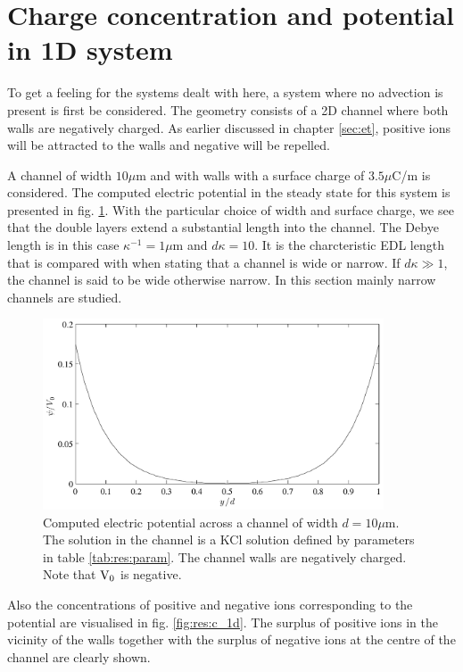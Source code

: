 \section{Charge concentration and potential in 1D system}
To get a feeling for the systems dealt with here, a system where no
advection is present is first be considered. The geometry consists
of a 2D channel where both walls are negatively charged. As earlier
discussed in chapter \ref{sec:et}, positive ions will be attracted to
the walls and negative will be repelled.

A channel of width $10 \mu$m and with walls with a surface charge of
$3.5 \mu$C/m is considered. The computed electric potential in the
steady state for this system is presented in
fig. \ref{fig:res:pot_1d}. With the particular choice of width and
surface charge, we see that the double layers extend a substantial
length into the channel. The Debye length is in this case $\kappa^{-1} =
1 \mu$m and $d\kappa = 10$. It is the charcteristic EDL length that
is compared with when stating that a channel is wide or
narrow. If $d\kappa \gg 1$, the channel is said to be wide otherwise
narrow. In this section mainly narrow channels are studied.

\begin{figure}
\begin{center}
\includegraphics[width=0.9\textwidth]{fig/potential_1d.pdf}
\end{center}
\caption{Computed electric potential across a channel of width $d = 10
  \mu$m. The solution in the channel is a KCl solution defined by
  parameters in table \ref{tab:res:param}. The channel walls are
  negatively charged. Note that $\mathrm{V_0}$ is negative.}
\label{fig:res:pot_1d}
\end{figure}

Also the concentrations of positive and negative ions corresponding to
the potential are visualised in fig. \ref{fig:res:c_1d}. The surplus
of positive ions in the vicinity of the walls together with the
surplus of negative ions at the centre of the channel are clearly shown. 

